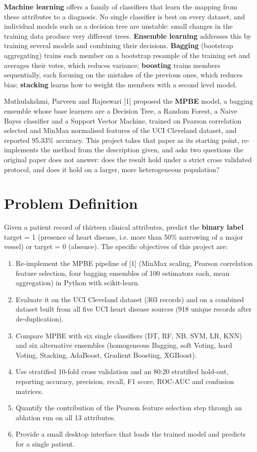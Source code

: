 \documentclass[12pt,a4paper,oneside]{report}
\begin{document}
\textbf{Machine learning} offers a family of classifiers that learn the mapping from these attributes to a diagnosis. No single classifier is best on every dataset, and individual models such as a decision tree are unstable: small changes in the training data produce very different trees. \textbf{Ensemble learning} addresses this by training several models and combining their decisions. \textbf{Bagging} (bootstrap aggregating) trains each member on a bootstrap resample of the training set and averages their votes, which reduces variance; \textbf{boosting} trains members sequentially, each focusing on the mistakes of the previous ones, which reduces bias; \textbf{stacking} learns how to weight the members with a second level model.

Muthulakshmi, Parveen and Rajeswari [1] proposed the \textbf{MPBE} model, a bagging ensemble whose base learners are a Decision Tree, a Random Forest, a Naive Bayes classifier and a Support Vector Machine, trained on Pearson correlation selected and MinMax normalised features of the UCI Cleveland dataset, and reported 95.33\% accuracy. This project takes that paper as its starting point, re-implements the method from the description given, and asks two questions the original paper does not answer: does the result hold under a strict cross validated protocol, and does it hold on a larger, more heterogeneous population?

\section{Problem Definition}
Given a patient record of thirteen clinical attributes, predict the \textbf{binary label} target = 1 (presence of heart disease, i.e. more than 50\% narrowing of a major vessel) or target = 0 (absence). The specific objectives of this project are:

\begin{enumerate}
  \item Re-implement the MPBE pipeline of [1] (MinMax scaling, Pearson correlation feature selection, four bagging ensembles of 100 estimators each, mean aggregation) in Python with scikit-learn.
  \item Evaluate it on the UCI Cleveland dataset (303 records) and on a combined dataset built from all five UCI heart disease sources (918 unique records after de-duplication).
  \item Compare MPBE with six single classifiers (DT, RF, NB, SVM, LR, KNN) and six alternative ensembles (homogeneous Bagging, soft Voting, hard Voting, Stacking, AdaBoost, Gradient Boosting, XGBoost).
  \item Use stratified 10-fold cross validation and an 80:20 stratified hold-out, reporting accuracy, precision, recall, F1 score, ROC-AUC and confusion matrices.
  \item Quantify the contribution of the Pearson feature selection step through an ablation run on all 13 attributes.
  \item Provide a small desktop interface that loads the trained model and predicts for a single patient.
\end{enumerate}
\end{document}
